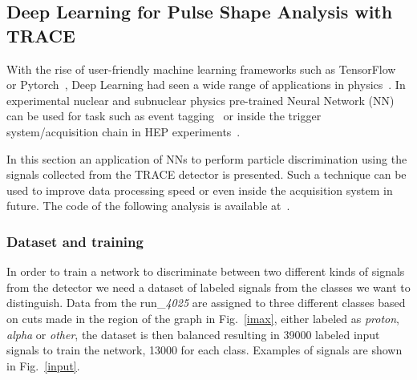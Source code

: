 \subsection{Deep Learning for Pulse Shape Analysis with TRACE}
With the rise of user-friendly machine learning frameworks such as TensorFlow~\cite{tensorflow} or Pytorch~\cite{pytorch}, Deep Learning had seen a wide range of applications in physics~\cite{ml4phys}. In experimental nuclear and subnuclear physics pre-trained Neural Network (NN) can be used for task such as event tagging~\cite{baldi} or inside the trigger system/acquisition chain in HEP experiments~\cite{williams}. 


In this section an application of NNs to perform particle discrimination using the signals collected from the TRACE detector is presented. Such a technique can be used to improve data processing speed or even inside the acquisition system in future.
The code of the following analysis is available at~\cite{github-nn}.

\subsubsection{Dataset and training}

In order to train a network to discriminate between two different kinds of signals from the detector we need a dataset of labeled signals from the classes we want to distinguish. Data from the run_\emph{4025} are assigned to three different classes based on cuts made in the region of the graph in Fig.~\ref{imax}, either labeled as \emph{proton}, \emph{alpha} or \emph{other}, the dataset is then balanced resulting in \num{39000} labeled input signals to train the network, \num{13000} for each class. Examples of signals are shown in Fig.~\ref{input}.

